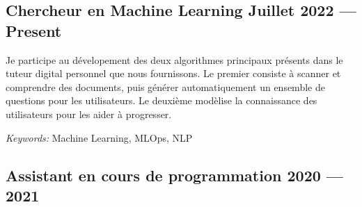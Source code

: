 \subsection{Chercheur en Machine Learning \hfill Juillet 2022 --- Present}
\vspace{0.7\baselineskip}

Je participe au dévelopement des deux algorithmes principaux présents dans le tuteur digital personnel que nous
fournissons. Le premier consiste à scanner et comprendre des documents, puis générer automatiquement un ensemble de
questions pour les utilisateurs. Le deuxième modèlise la connaissance des utilisateurs pour les aider à progresser.

\textit{Keywords:} Machine Learning, MLOps, NLP
\vspace{0.35\baselineskip}





\subsection{Assistant en cours de programmation \hfill 2020 --- 2021}
\vspace{0.7\baselineskip}

